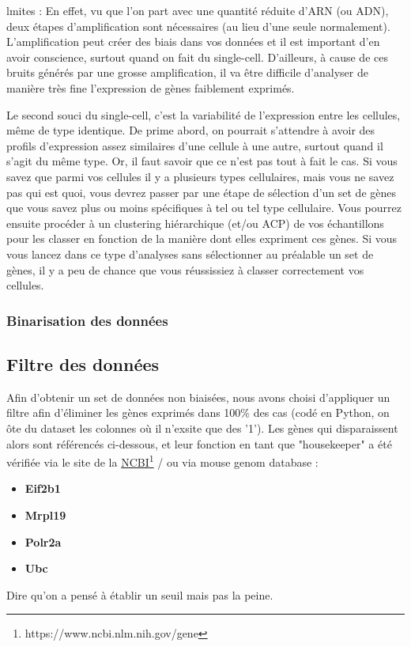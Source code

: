 \documentclass[fleqn,11pt]{SelfArx} %
\begin{document}
lmites : En effet, vu que l'on part avec une quantité réduite d'ARN (ou ADN), deux étapes d'amplification sont nécessaires (au lieu d'une seule normalement). L'amplification peut créer des biais dans vos données et il est important d'en avoir conscience, surtout quand on fait du single-cell. D'ailleurs, à cause de ces bruits générés par une grosse amplification, il va être difficile d'analyser de manière très fine l'expression de gènes faiblement exprimés.

Le second souci du single-cell, c'est la  variabilité de l'expression entre les cellules, même de type identique. De prime abord, on pourrait s'attendre à avoir des profils d'expression assez similaires d'une cellule à une autre, surtout quand il s'agit du même type. Or, il faut savoir que ce n'est pas tout à fait le cas. Si vous savez que parmi vos cellules il y a plusieurs types cellulaires, mais vous ne savez pas qui est quoi, vous devrez passer par une étape de sélection d'un set de gènes que vous savez plus ou moins spécifiques à tel ou tel type cellulaire. Vous pourrez ensuite procéder à un clustering hiérarchique (et/ou ACP) de vos échantillons pour les classer en fonction de la manière dont elles expriment ces gènes. Si vous vous lancez dans ce type d'analyses sans sélectionner au préalable un set de gènes, il y a peu de chance que vous réussissiez à classer correctement vos cellules.

\subsubsection{Binarisation des données}



\subsection{Filtre des données}
Afin d'obtenir un set de données non biaisées, nous avons choisi d'appliquer un filtre afin d'éliminer les gènes exprimés dans 100\% des cas (codé en Python, on ôte du dataset les colonnes où il n'exsite que des '1'). Les gènes qui disparaissent alors sont référencés ci-dessous, et leur fonction en tant que "housekeeper" a été vérifiée via le site de la \href{https://www.ncbi.nlm.nih.gov/gene}{NCBI}\footnote{https://www.ncbi.nlm.nih.gov/gene} / ou via mouse genom database :
\begin{itemize}
\item \textbf{Eif2b1}
\item \textbf{Mrpl19}
\item \textbf{Polr2a}
\item \textbf{Ubc} 
\end{itemize}
Dire qu'on a pensé à établir un seuil mais pas la peine. 
\end{document}
